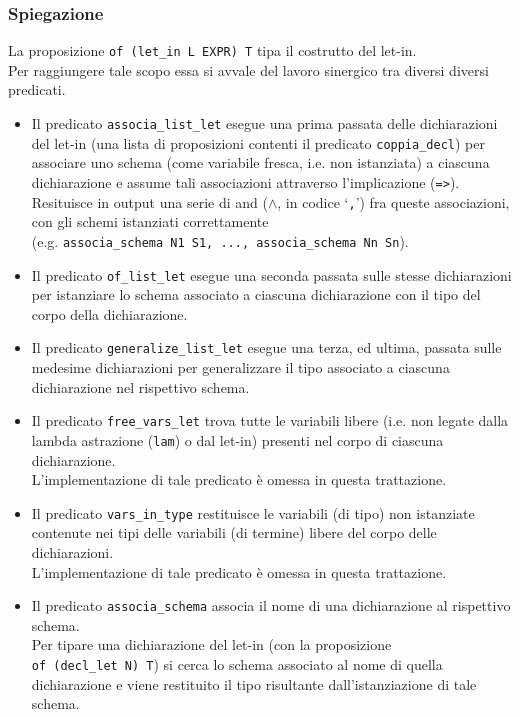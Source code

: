 \documentclass[12pt,a4paper,openright,twoside]{report}
\begin{document}
\subsubsection{Spiegazione}
La proposizione \verb"of (let_in L EXPR) T" tipa il costrutto del let-in.\\
Per raggiungere tale scopo essa si avvale del lavoro sinergico tra diversi diversi predicati.
\begin{itemize}
 \item Il predicato \verb"associa_list_let" esegue una prima passata delle dichiarazioni del let-in (una lista di proposizioni contenti il predicato \verb"coppia_decl") per associare uno schema (come variabile fresca, i.e. non istanziata) a ciascuna dichiarazione e assume tali associazioni attraverso l'implicazione (\verb"=>").\\
 Resituisce in output una serie di and ($\wedge$, in codice `\verb","') fra queste associazioni, con gli schemi istanziati correttamente\\
 (e.g. \verb"associa_schema N1 S1, ..., associa_schema Nn Sn").
 \item Il predicato \verb"of_list_let" esegue una seconda passata sulle stesse dichiarazioni per istanziare lo schema associato a ciascuna dichiarazione con il tipo del corpo della dichiarazione.
 \item Il predicato \verb"generalize_list_let" esegue una terza, ed ultima, passata sulle medesime dichiarazioni per generalizzare il tipo associato a ciascuna dichiarazione nel rispettivo schema.
 \item Il predicato \verb"free_vars_let" trova tutte le variabili libere (i.e. non legate dalla lambda astrazione (\verb"lam") o dal let-in) presenti nel corpo di ciascuna dichiarazione.\\
 L'implementazione di tale predicato è omessa in questa trattazione.
 \item Il predicato \verb"vars_in_type" restituisce le variabili (di tipo) non istanziate contenute nei tipi delle variabili (di termine) libere del corpo delle dichiarazioni.\\
 L'implementazione di tale predicato è omessa in questa trattazione.
 \item Il predicato \verb"associa_schema" associa il nome di una dichiarazione al rispettivo schema.\\
 Per tipare una dichiarazione del let-in (con la proposizione\\
 \verb"of (decl_let N) T") si cerca lo schema associato al nome di quella dichiarazione e viene restituito il tipo risultante dall'istanziazione di tale schema.

\end{itemize}
\end{document}
